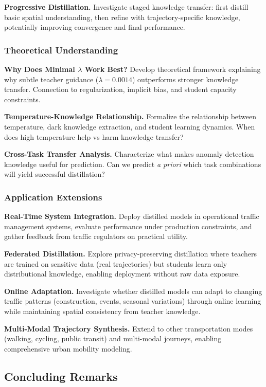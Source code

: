 \textbf{Progressive Distillation.} Investigate staged knowledge transfer: first distill basic spatial understanding, then refine with trajectory-specific knowledge, potentially improving convergence and final performance.

\subsubsection{Theoretical Understanding}

\textbf{Why Does Minimal $\lambda$ Work Best?} Develop theoretical framework explaining why subtle teacher guidance ($\lambda = 0.0014$) outperforms stronger knowledge transfer. Connection to regularization, implicit bias, and student capacity constraints.

\textbf{Temperature-Knowledge Relationship.} Formalize the relationship between temperature, dark knowledge extraction, and student learning dynamics. When does high temperature help vs harm knowledge transfer?

\textbf{Cross-Task Transfer Analysis.} Characterize what makes anomaly detection knowledge useful for prediction. Can we predict \emph{a priori} which task combinations will yield successful distillation?

\subsubsection{Application Extensions}

\textbf{Real-Time System Integration.} Deploy distilled models in operational traffic management systems, evaluate performance under production constraints, and gather feedback from traffic regulators on practical utility.

\textbf{Federated Distillation.} Explore privacy-preserving distillation where teachers are trained on sensitive data (real trajectories) but students learn only distributional knowledge, enabling deployment without raw data exposure.

\textbf{Online Adaptation.} Investigate whether distilled models can adapt to changing traffic patterns (construction, events, seasonal variations) through online learning while maintaining spatial consistency from teacher knowledge.

\textbf{Multi-Modal Trajectory Synthesis.} Extend to other transportation modes (walking, cycling, public transit) and multi-modal journeys, enabling comprehensive urban mobility modeling.

\subsection{Concluding Remarks}
\label{sec:conclusion-remarks}

